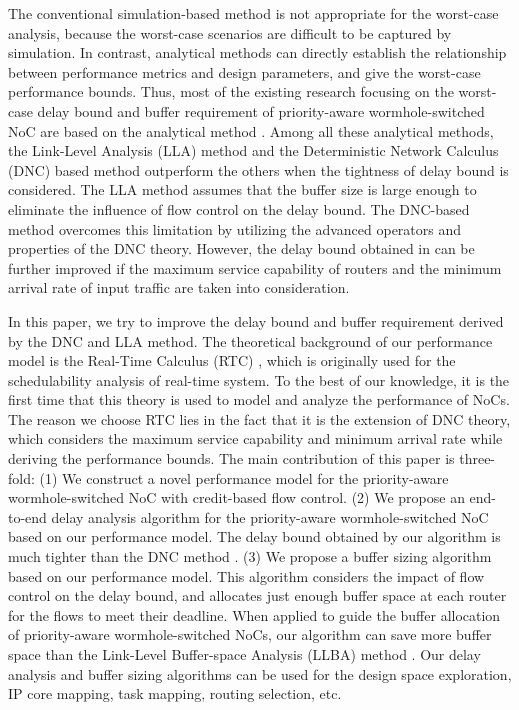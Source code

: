 \documentclass[preprint]{elsarticle}
\begin{document}
The conventional simulation-based method is not appropriate for the worst-case analysis, because the worst-case scenarios are difficult to be captured by simulation. In contrast, analytical methods can directly establish the relationship between performance metrics and design parameters, and give the worst-case performance bounds. Thus, most of the existing research focusing on the worst-case delay bound and buffer requirement of priority-aware wormhole-switched NoC are based on the analytical method \cite{Shi:2008:RCA:1397757.1397996,73,Qian489900,LuJS05,707545,708526,189}. Among all these analytical methods, the Link-Level Analysis (LLA) method \cite{73,189} and the Deterministic Network Calculus (DNC) \cite{Qian489900} based method outperform the others when the tightness of delay bound is considered. The LLA method assumes that the buffer size is large enough to eliminate the influence of flow control on the delay bound. The DNC-based method \cite{Qian489900} overcomes this limitation by utilizing the advanced operators and properties of the DNC theory. However, the delay bound obtained in \cite{Qian489900} can be further improved if the maximum service capability of routers and the minimum arrival rate of input traffic are taken into consideration.

In this paper, we try to improve the delay bound and buffer requirement derived by the DNC \cite{Qian489900} and LLA \cite{73,189} method. The theoretical background of our performance model is the Real-Time Calculus (RTC) \cite{1253607}, which is originally used for the schedulability analysis of real-time system. To the best of our knowledge, it is the first time that this theory is used to model and analyze the performance of NoCs. The reason we choose RTC lies in the fact that it is the extension of DNC theory, which considers the maximum service capability and minimum arrival rate while deriving the performance bounds. The main contribution of this paper is three-fold: (1) We construct a novel performance model for the priority-aware wormhole-switched NoC with credit-based flow control. (2) We propose an end-to-end delay analysis algorithm for the priority-aware wormhole-switched NoC based on our performance model. The delay bound obtained by our algorithm is much tighter than the DNC method \cite{Qian489900}. (3) We propose a buffer sizing algorithm based on our performance model. This algorithm considers the impact of flow control on the delay bound, and allocates just enough buffer space at each router for the flows to meet their deadline. When applied to guide the buffer allocation of priority-aware wormhole-switched NoCs, our algorithm can save more buffer space than the Link-Level Buffer-space Analysis (LLBA) method \cite{189}. Our delay analysis and buffer sizing algorithms can be used for the design space exploration, IP core mapping, task mapping, routing selection, etc.
\end{document}
